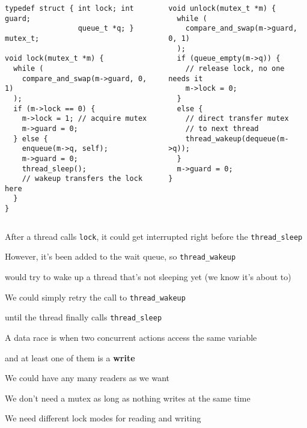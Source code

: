   \begin{slide}


    \begin{columns}
      \begin{column}{0.5\textwidth}
        \begin{verbatim}
typedef struct { int lock; int guard;
                 queue_t *q; } mutex_t;

void lock(mutex_t *m) {
  while (
    compare_and_swap(m->guard, 0, 1)
  );
  if (m->lock == 0) {
    m->lock = 1; // acquire mutex
    m->guard = 0;
  } else {
    enqueue(m->q, self);
    m->guard = 0;
    thread_sleep();
    // wakeup transfers the lock here
  }
}
        \end{verbatim}
      \end{column}
      \begin{column}{0.5\textwidth}
        \begin{verbatim}
void unlock(mutex_t *m) {
  while (
    compare_and_swap(m->guard, 0, 1)
  );
  if (queue_empty(m->q)) {
    // release lock, no one needs it
    m->lock = 0; 
  }
  else {
    // direct transfer mutex
    // to next thread
    thread_wakeup(dequeue(m->q));
  }
  m->guard = 0;
}
        \end{verbatim}
      \end{column}
    \end{columns}

  \end{slide}

  \begin{slide}


    After a thread calls \texttt{lock}, it could get interrupted right before
    the \texttt{thread\_sleep}
    \medskip

    However, it's been added to the wait queue, so \texttt{thread\_wakeup}

    would try to wake up a thread that's not sleeping yet (we know it's about
    to)
    \medskip

    We could simply retry the call to \texttt{thread\_wakeup}

    until the thread finally calls \texttt{thread\_sleep}

  \end{slide}

  \begin{slide}


    A data race is when two concurrent actions access the same variable

    and at least one of them is a \textbf{write}
    \medskip

    We could have any many readers as we want

    \leftspace{}We don't need a mutex as long as nothing writes at the same
    time
    \medskip

    We need different lock modes for reading and writing

  \end{slide}

